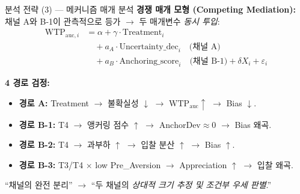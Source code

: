 \documentclass[aspectratio=169]{beamer}
\begin{document}
\begin{frame}{분석 전략 (3) --- 메커니즘 매개 분석}
  \textbf{경쟁 매개 모형 (Competing Mediation):}\\
  채널 A와 B-1이 관측적으로 등가 $\rightarrow$ 두 매개변수 \emph{동시 투입}:
  \begin{align*}
    \mathrm{WTP}_{\text{auc},i} &= \alpha + \gamma \cdot \mathrm{Treatment}_i \\
                                 &\quad + a_A \cdot \mathrm{Uncertainty\_dec}_i \quad\text{(채널 A)} \\
                                 &\quad + a_B \cdot \mathrm{Anchoring\_score}_i \quad\text{(채널 B-1)} + \delta X_i + \varepsilon_i
  \end{align*}

  \vspace{0.3em}
  \textbf{4 경로 검정:}
  \begin{itemize}\itemsep0.1em
    \item \textbf{경로 A:} Treatment $\rightarrow$ 불확실성 $\downarrow$ $\rightarrow$ $\mathrm{WTP}_{\text{auc}} \uparrow$ $\rightarrow$ Bias $\downarrow$.
    \item \textbf{경로 B-1:} T4 $\rightarrow$ 앵커링 점수 $\uparrow$ $\rightarrow$ $\mathrm{AnchorDev} \approx 0$ $\rightarrow$ Bias 왜곡.
    \item \textbf{경로 B-2:} T4 $\rightarrow$ 과부하 $\uparrow$ $\rightarrow$ 입찰 분산 $\uparrow$ $\rightarrow$ Bias $\uparrow$.
    \item \textbf{경로 B-3:} T3/T4 $\times$ low Pre\_Aversion $\rightarrow$ Appreciation $\uparrow$ $\rightarrow$ 입찰 왜곡.
  \end{itemize}

  \vspace{0.3em}
   ``채널의 완전 분리'' $\rightarrow$ ``두 채널의 \emph{상대적 크기 추정 및 조건부 우세 판별}.''
\end{frame}
\end{document}
